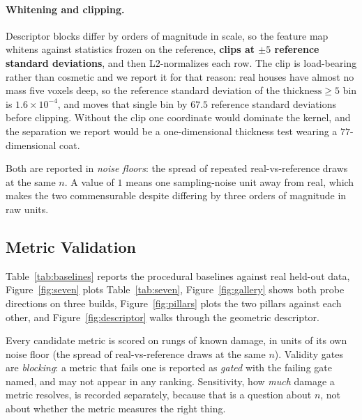 \paragraph{Whitening and clipping.} Descriptor blocks differ by orders of
magnitude in scale, so the feature map whitens against statistics frozen on the
reference, \textbf{clips at $\pm 5$ reference standard deviations}, and then
L2-normalizes each row. The clip is load-bearing rather than cosmetic and we
report it for that reason: real houses have almost no mass five voxels deep, so
the reference standard deviation of the $\text{thickness} \geq 5$ bin is
$1.6\times10^{-4}$, and \solidify{} moves that single bin by $67.5$ reference
standard deviations before clipping. Without the clip one coordinate would
dominate the kernel, and the separation we report would be a one-dimensional
thickness test wearing a $77$-dimensional coat.

Both are reported in \emph{noise floors}: the spread of repeated real-vs-reference
draws at the same $n$. A value of $1$ means one sampling-noise unit away from
real, which makes the two commensurable despite differing by three orders of
magnitude in raw units.

\subsection{Metric Validation}

Table~\ref{tab:baselines} reports the procedural baselines against real held-out data,
Figure~\ref{fig:seven} plots Table~\ref{tab:seven}, Figure~\ref{fig:gallery} shows both
probe directions on three builds,
Figure~\ref{fig:pillars} plots the two pillars against each other, and
Figure~\ref{fig:descriptor} walks through the geometric descriptor.

Every candidate metric is scored on rungs of known damage, in units of its own
noise floor (the spread of real-vs-reference draws at the same $n$). Validity
gates are \emph{blocking}: a metric that fails one is reported as \emph{gated}
with the failing gate named, and may not appear in any ranking. Sensitivity, how
\emph{much} damage a metric resolves, is recorded separately, because
that is a question about $n$, not about whether the metric measures the right
thing.

